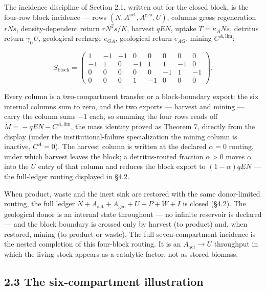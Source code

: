 \documentclass[11pt]{article}
\begin{document}
The incidence discipline of Section 2.1, written out for the closed block, is the four-row block incidence --- rows \((N,\allowbreak{} A^{\mathrm{act}},\allowbreak{} A^{\mathrm{geo}},\allowbreak{} U)\), columns gross regeneration \(rNs\), density-dependent return \(rN^2 s/\allowbreak{}K\), harvest \(qEN\), uptake \(T = \kappa_A N s\), detritus return \(\gamma_U U\), geological recharge \(e_{GA}\), geological return \(e_{AG}\), mining \(C^{A,\mathrm{lim}}\): 

$$S_{\mathrm{block}} = \begin{pmatrix} 1 & -1 & -1 & 0 & 0 & 0 & 0 & 0 \\ -1 & 1 & 0 & -1 & 1 & 1 & -1 & 0 \\ 0 & 0 & 0 & 0 & 0 & -1 & 1 & -1 \\ 0 & 0 & 0 & 1 & -1 & 0 & 0 & 0 \end{pmatrix}.$$

 Every column is a two-compartment transfer or a block-boundary export: the six internal columns sum to zero, and the two exports --- harvest and mining --- carry the column sums \(-1\) each, so summing the four rows reads off \(\dot M =\allowbreak{} -qEN - C^{A,\allowbreak{}\mathrm{lim}}\), the mass identity proved as Theorem 7, directly from the display (under the institutional-failure specialization the mining column is inactive, \(C^A = 0\)). The harvest column is written at the declared \(\alpha=0\) routing, under which harvest leaves the block; a detritus-routed fraction \(\alpha>0\) moves \(\alpha\) into the \(U\) entry of that column and reduces the block export to \((1-\alpha)qEN\) --- the full-ledger routing displayed in \S4.2.

When product, waste and the inert sink are restored with the same donor-limited routing, the full ledger \(N+\allowbreak{}A_{\mathrm{act}}+\allowbreak{}A_{\mathrm{geo}}+\allowbreak{}U+\allowbreak{}P+\allowbreak{}W+\allowbreak{}I\) is closed (\S4.2). The geological donor is an internal state throughout --- no infinite reservoir is declared --- and the block boundary is crossed only by harvest (to product) and, when restored, mining (to product or waste). The full seven-compartment incidence is the nested completion of this four-block routing. It is an \(A_{\mathrm{act}}\to U\) throughput in which the living stock appears as a catalytic factor, not as stored biomass.

\subsection*{2.3 The six-compartment illustration}\label{23-the-six-compartment-illustration}
\end{document}
